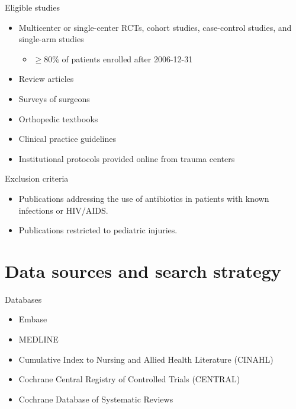 \documentclass{beamer}
\begin{document}
\begin{frame}{Eligible studies}
    \begin{itemize}
        \item Multicenter or single-center RCTs, cohort studies, case-control
              studies, and single-arm studies
            \begin{itemize}
                \item $\ge 80\%$ of patients enrolled after 2006-12-31
            \end{itemize}
        \item Review articles
        \item Surveys of surgeons
        \item Orthopedic textbooks
        \item Clinical practice guidelines
        \item Institutional protocols provided online from trauma centers
    \end{itemize}
\end{frame}

\begin{frame}{Exclusion criteria}
    \begin{itemize}
        \item Publications addressing the use of antibiotics in patients with
              known infections or HIV/AIDS.
        \item Publications restricted to pediatric injuries.
    \end{itemize}
\end{frame}

\section{Data sources and search strategy}
\begin{frame}{Databases}
    \begin{itemize}
        \item Embase
        \item MEDLINE
        \item Cumulative Index to Nursing and Allied Health Literature (CINAHL)
        \item Cochrane Central Registry of Controlled Trials (CENTRAL)
        \item Cochrane Database of Systematic Reviews
    \end{itemize}
\end{frame}
\end{document}
